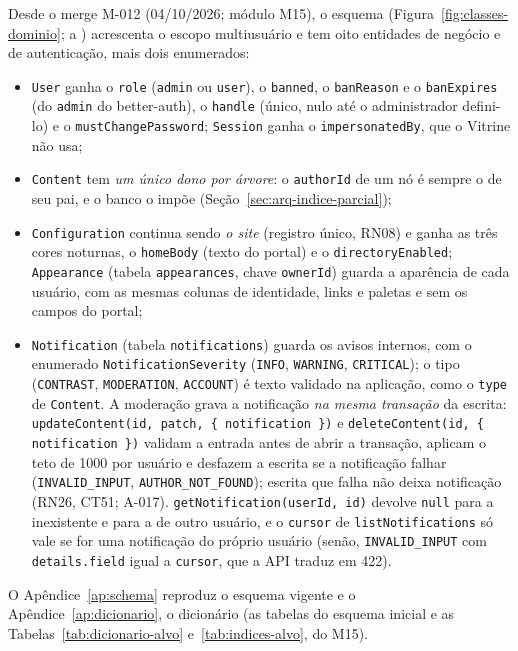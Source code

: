 Desde o merge M-012 (04/10/2026; módulo M15), o esquema (Figura~\ref{fig:classes-dominio};  a ) acrescenta o escopo multiusuário e tem oito entidades de negócio e de autenticação, mais dois enumerados:
\begin{itemize}
  \item \texttt{User} ganha o \texttt{role} (\texttt{admin} ou \texttt{user}), o \texttt{banned}, o \texttt{banReason} e o \texttt{banExpires} (do  \texttt{admin} do better-auth), o \texttt{handle} (único, nulo até o administrador defini-lo) e o \texttt{mustChangePassword}; \texttt{Session} ganha o \texttt{impersonatedBy}, que o Vitrine não usa;
  \item \texttt{Content} tem \emph{um único dono por árvore}: o \texttt{authorId} de um nó é sempre o de seu pai, e o banco o impõe (Seção~\ref{sec:arq-indice-parcial});
  \item \texttt{Configuration} continua sendo \emph{o site} (registro único, RN08) e ganha as três cores noturnas, o \texttt{homeBody} (texto do portal) e o \texttt{directoryEnabled}; \texttt{Appearance} (tabela \texttt{appearances}, chave \texttt{ownerId}) guarda a aparência de cada usuário, com as mesmas colunas de identidade, links e paletas e sem os campos do portal;
  \item \texttt{Notification} (tabela \texttt{notifications}) guarda os avisos internos, com o enumerado \texttt{NotificationSeverity} (\texttt{INFO}, \texttt{WARNING}, \texttt{CRITICAL}); o tipo (\texttt{CONTRAST}, \texttt{MODERATION}, \texttt{ACCOUNT}) é texto validado na aplicação, como o \texttt{type} de \texttt{Content}. A moderação grava a notificação \emph{na mesma transação} da escrita: \texttt{updateContent(id, patch, \{ notification \})} e \texttt{deleteContent(id, \{ notification \})} validam a entrada antes de abrir a transação, aplicam o teto de 1000 por usuário e desfazem a escrita se a notificação falhar (\texttt{INVALID\_INPUT}, \texttt{AUTHOR\_NOT\_FOUND}); escrita que falha não deixa notificação (RN26, CT51; A-017). \texttt{getNotification(userId, id)} devolve \texttt{null} para a inexistente e para a de outro usuário, e o \texttt{cursor} de \texttt{listNotifications} só vale se for uma notificação do próprio usuário (senão, \texttt{INVALID\_INPUT} com \texttt{details.field} igual a \texttt{cursor}, que a API traduz em 422).
\end{itemize}
O Apêndice~\ref{ap:schema} reproduz o esquema vigente e o Apêndice~\ref{ap:dicionario}, o dicionário (as tabelas do esquema inicial e as Tabelas~\ref{tab:dicionario-alvo} e~\ref{tab:indices-alvo}, do M15).

